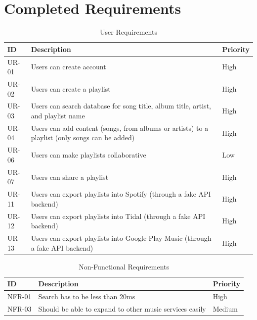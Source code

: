 \documentclass[12pt]{article}
\begin{document}
\section{Completed Requirements}
\begin{table}[H]
	\centering
	\label{tab:urc}
	\caption*{User Requirements}
	\begin{tabularx}{450pt}{lXl}
		ID & Description & Priority\\\hline
		UR-01 & Users can create account & High \\
		UR-02 & Users can create a playlist & High \\
		UR-03 & Users can search database for song title, album title,
		artist, and playlist name & High \\
		UR-04 & Users can add content (songs, from albums or artists) to a playlist (only songs can be added) & High \\
		UR-06 & Users can make playlists collaborative & Low \\
		UR-07 & Users can share a playlist & High \\
		UR-11 & Users can export playlists into Spotify (through a fake API backend) & High \\
		UR-12 & Users can export playlists into Tidal (through a fake API backend) & High \\
		UR-13 & Users can export playlists into Google Play Music (through a fake API backend) & High \\
	\end{tabularx}
\end{table}
\begin{table}[H]
	\centering
	\label{tab:nfrc}
	\caption*{Non-Functional Requirements}
	\begin{tabularx}{450pt}{lXl}
		ID & Description & Priority\\\hline
		NFR-01 & Search has to be less than 20ms & High \\
		NFR-03 & Should be able to expand to other music services easily & Medium \\
	\end{tabularx}
\end{table}
\end{document}
